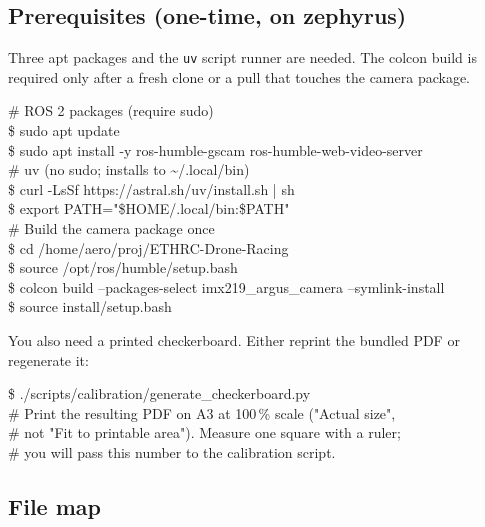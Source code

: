 \documentclass[11pt,a4paper]{article}
\begin{document}
\subsection{Prerequisites (one-time, on zephyrus)}

Three apt packages and the \texttt{uv} script runner are needed. The colcon build is required only after a fresh clone or a pull that touches the camera package.

\begin{codebox}
\textcolor{ethMuted}{\# ROS 2 packages (require sudo)}\\
\$ sudo apt update\\
\$ sudo apt install -y ros-humble-gscam ros-humble-web-video-server\\[4pt]
\textcolor{ethMuted}{\# uv (no sudo; installs to \textasciitilde{}/.local/bin)}\\
\$ curl -LsSf https://astral.sh/uv/install.sh | sh\\
\$ export PATH="\$HOME/.local/bin:\$PATH"\\[4pt]
\textcolor{ethMuted}{\# Build the camera package once}\\
\$ cd /home/aero/proj/ETHRC-Drone-Racing\\
\$ source /opt/ros/humble/setup.bash\\
\$ colcon build --packages-select imx219\_argus\_camera --symlink-install\\
\$ source install/setup.bash
\end{codebox}

You also need a printed checkerboard. Either reprint the bundled PDF or regenerate it:
\begin{codebox}
\$ ./scripts/calibration/generate\_checkerboard.py\\
\textcolor{ethMuted}{\# Print the resulting PDF on A3 at 100\,\% scale ("Actual size",}\\
\textcolor{ethMuted}{\# not "Fit to printable area"). Measure one square with a ruler;}\\
\textcolor{ethMuted}{\# you will pass this number to the calibration script.}
\end{codebox}

\subsection{File map}
\end{document}

